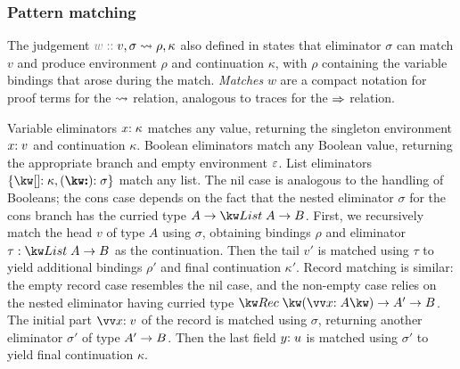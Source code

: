 \subsubsection{Pattern matching}
\label{sec:core-language:pattern-match}

The judgement $\explVal{w}{v, \sigma \matchR \rho, \kappa}$ also defined in  states that eliminator $\sigma$ can match $v$ and produce environment $\rho$ and continuation $\kappa$, with $\rho$ containing the variable bindings that arose during the match. \emph{Matches} $w$ are a compact notation for proof terms for the $\rightsquigarrow$ relation, analogous to traces for the $\Rightarrow$ relation.

Variable eliminators ${x}{:}\;{\kappa}$ matches any value, returning the singleton environment $x{:}\;v$ and continuation $\kappa$. Boolean eliminators match any Boolean value, returning the appropriate branch and empty environment $\varepsilon$. List eliminators $\elimList{\kappa}{\sigma}$ match any list. The nil case is analogous to the handling of Booleans; the cons case depends on the fact that the nested eliminator $\sigma$ for the cons branch has the curried type $\tyFun{A}{\tyFun{\tyList{A}}{B}}$. First, we recursively match the head $v$ of type $A$ using $\sigma$, obtaining bindings $\rho$ and eliminator $\tau: \tyFun{\tyList{A}}{B}$ as the continuation. Then the tail $v'$ is matched using $\tau$ to yield additional bindings $\rho'$ and final continuation $\kappa'$. Record matching is similar: the empty record case resembles the nil case, and the non-empty case relies on the nested eliminator having curried type $\tyFun{\tyRec{\vec{\bind{x}{A}}}}{\tyFun{A'}{B}}$. The initial part $\vec{\bind{x}{v}}$ of the record is matched using $\sigma$, returning another eliminator $\sigma'$ of type ${A'}\rightarrow{B}$. Then the last field $y{:}\;u$ is matched using $\sigma'$ to yield final continuation $\kappa$.
